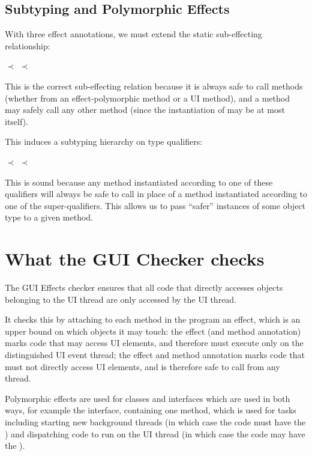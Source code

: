 \subsection{Subtyping and Polymorphic Effects}
With three effect annotations, we must extend the static sub-effecting relationship:

\centerline{ $\prec$  $\prec$ }

This is the correct sub-effecting relation because it is always safe to call 
methods (whether from an effect-polymorphic method or a UI method), and a  method
may safely call any other method (since the instantiation of  may be at most
 itself).

This induces a subtyping hierarchy on type qualifiers:

\centerline{ $\prec$  $\prec$ }

This is sound because any method instantiated according to one of these qualifiers will always be
safe to call in place of a method instantiated according to one of the super-qualifiers.
This allows us to pass ``safer'' instances of some object type to a given method.

\section{What the GUI Checker checks\label{gui-checks}}
The GUI Effects checker ensures that all code that directly accesses objects belonging to the UI
thread are only accessed by the UI thread.

It checks this by attaching to each method in the program an effect, which is an upper bound on
which objects it may touch: the  effect (and method annotation) marks code that may
access UI elements, and therefore must execute only on the distinguished UI event thread; the
 effect and method annotation marks code that must not directly access UI
elements, and is therefore safe to call from any thread.

Polymorphic effects are used for classes and interfaces which are used in both ways, for example the
 interface, containing one method, which is used for tasks including
starting new background threads (in which case the code must have the ) and
dispatching code to run on the UI thread (in which case the code may have the ).

